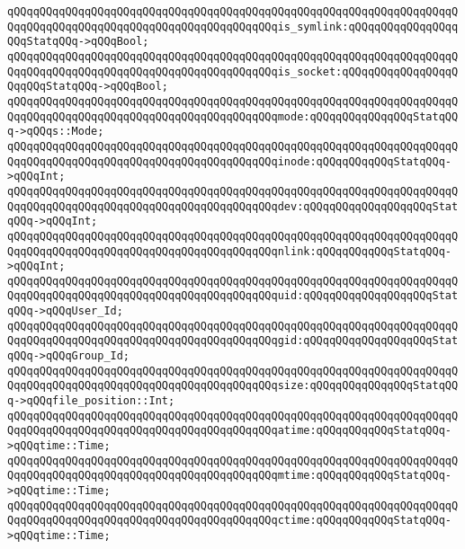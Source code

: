 \verb|qQQqqQQqqQQqqQQqqQQqqQQqqQQqqQQqqQQqqQQqqQQqqQQqqQQqqQQqqQQqqQQqqQQqqQQqqQQqqQQqqQQqqQQqqQQqqQQqqQQqqQQqqQQqqQQqis_symlink:qQQqqQQqqQQqqQQqqQQqStatqQQq->qQQqBool;|\newline
\verb|qQQqqQQqqQQqqQQqqQQqqQQqqQQqqQQqqQQqqQQqqQQqqQQqqQQqqQQqqQQqqQQqqQQqqQQqqQQqqQQqqQQqqQQqqQQqqQQqqQQqqQQqqQQqqQQqis_socket:qQQqqQQqqQQqqQQqqQQqqQQqStatqQQq->qQQqBool;|\newline
\newline
\verb|qQQqqQQqqQQqqQQqqQQqqQQqqQQqqQQqqQQqqQQqqQQqqQQqqQQqqQQqqQQqqQQqqQQqqQQqqQQqqQQqqQQqqQQqqQQqqQQqqQQqqQQqqQQqqQQqmode:qQQqqQQqqQQqqQQqStatqQQq->qQQqs::Mode;|\newline
\verb|qQQqqQQqqQQqqQQqqQQqqQQqqQQqqQQqqQQqqQQqqQQqqQQqqQQqqQQqqQQqqQQqqQQqqQQqqQQqqQQqqQQqqQQqqQQqqQQqqQQqqQQqqQQqqQQqinode:qQQqqQQqqQQqStatqQQq->qQQqInt;|\newline
\verb|qQQqqQQqqQQqqQQqqQQqqQQqqQQqqQQqqQQqqQQqqQQqqQQqqQQqqQQqqQQqqQQqqQQqqQQqqQQqqQQqqQQqqQQqqQQqqQQqqQQqqQQqqQQqqQQqdev:qQQqqQQqqQQqqQQqqQQqStatqQQq->qQQqInt;|\newline
\verb|qQQqqQQqqQQqqQQqqQQqqQQqqQQqqQQqqQQqqQQqqQQqqQQqqQQqqQQqqQQqqQQqqQQqqQQqqQQqqQQqqQQqqQQqqQQqqQQqqQQqqQQqqQQqqQQqnlink:qQQqqQQqqQQqStatqQQq->qQQqInt;|\newline
\verb|qQQqqQQqqQQqqQQqqQQqqQQqqQQqqQQqqQQqqQQqqQQqqQQqqQQqqQQqqQQqqQQqqQQqqQQqqQQqqQQqqQQqqQQqqQQqqQQqqQQqqQQqqQQqqQQquid:qQQqqQQqqQQqqQQqqQQqStatqQQq->qQQqUser_Id;|\newline
\verb|qQQqqQQqqQQqqQQqqQQqqQQqqQQqqQQqqQQqqQQqqQQqqQQqqQQqqQQqqQQqqQQqqQQqqQQqqQQqqQQqqQQqqQQqqQQqqQQqqQQqqQQqqQQqqQQqgid:qQQqqQQqqQQqqQQqqQQqStatqQQq->qQQqGroup_Id;|\newline
\verb|qQQqqQQqqQQqqQQqqQQqqQQqqQQqqQQqqQQqqQQqqQQqqQQqqQQqqQQqqQQqqQQqqQQqqQQqqQQqqQQqqQQqqQQqqQQqqQQqqQQqqQQqqQQqqQQqsize:qQQqqQQqqQQqqQQqStatqQQq->qQQqfile_position::Int;|\newline
\verb|qQQqqQQqqQQqqQQqqQQqqQQqqQQqqQQqqQQqqQQqqQQqqQQqqQQqqQQqqQQqqQQqqQQqqQQqqQQqqQQqqQQqqQQqqQQqqQQqqQQqqQQqqQQqqQQqatime:qQQqqQQqqQQqStatqQQq->qQQqtime::Time;|\newline
\verb|qQQqqQQqqQQqqQQqqQQqqQQqqQQqqQQqqQQqqQQqqQQqqQQqqQQqqQQqqQQqqQQqqQQqqQQqqQQqqQQqqQQqqQQqqQQqqQQqqQQqqQQqqQQqqQQqmtime:qQQqqQQqqQQqStatqQQq->qQQqtime::Time;|\newline
\verb|qQQqqQQqqQQqqQQqqQQqqQQqqQQqqQQqqQQqqQQqqQQqqQQqqQQqqQQqqQQqqQQqqQQqqQQqqQQqqQQqqQQqqQQqqQQqqQQqqQQqqQQqqQQqqQQqctime:qQQqqQQqqQQqStatqQQq->qQQqtime::Time;|\newline
